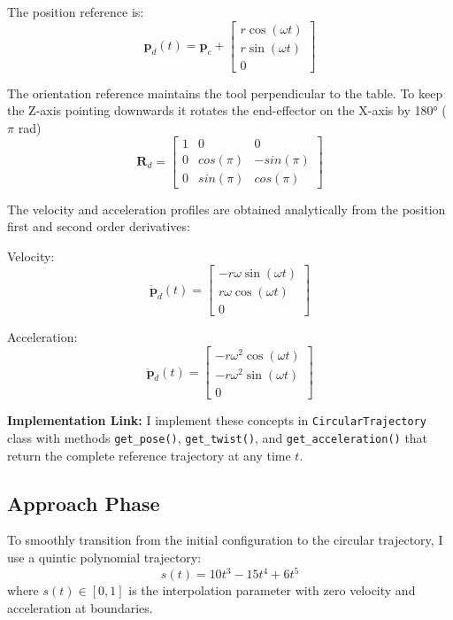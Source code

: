 \documentclass[journal,10pt,twocolumn]{IEEEtran}
\begin{document}
The position reference is:
\begin{equation}
\mathbf{p}_d(t) = \mathbf{p}_c + \begin{bmatrix} r\cos(\omega t) \\ r\sin(\omega t) \\ 0 \end{bmatrix}
\end{equation}

The orientation reference maintains the tool perpendicular to the table. To keep the Z-axis pointing downwards it rotates the end-effector on the X-axis by 180° ($\pi$ rad)
\begin{equation}
\mathbf{R}_d = \begin{bmatrix} 1 & 0 & 0 \\ 0 & cos(\pi) & -sin(\pi) \\ 0 & sin(\pi) & cos(\pi) \end{bmatrix}
\end{equation}

The velocity and acceleration profiles are obtained analytically from the position first and second order derivatives:

Velocity:
\begin{equation}
	\dot{\mathbf{p}}_d(t) = \begin{bmatrix} -r\omega\sin(\omega t) \\ r\omega\cos(\omega t) \\ 0 \end{bmatrix}
\end{equation}

Acceleration:
\begin{equation}
	\ddot{\mathbf{p}}_d(t) = \begin{bmatrix} -r\omega^2\cos(\omega t) \\ -r\omega^2\sin(\omega t) \\ 0 \end{bmatrix}
\end{equation}

\textbf{Implementation Link:} I implement these concepts in \texttt{CircularTrajectory} class with methods \texttt{get\_pose()}, \texttt{get\_twist()}, and \texttt{get\_acceleration()} that return the complete reference trajectory at any time $t$.

\subsection{Approach Phase}
To smoothly transition from the initial configuration to the circular trajectory, I use a quintic polynomial trajectory:
\begin{equation}
s(t) = 10t^3 - 15t^4 + 6t^5
\end{equation}
where $s(t) \in [0,1]$ is the interpolation parameter with zero velocity and acceleration at boundaries.
\end{document}

